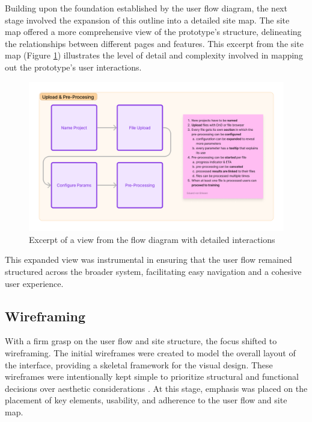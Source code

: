 Building upon the foundation established by the user flow diagram, the next stage involved the expansion of this outline into a detailed site map.
The site map offered a more comprehensive view of the prototype's structure, delineating the relationships between different pages and features.
This excerpt from the site map (Figure \ref{fig:design:flow-2}) illustrates the level of detail and complexity involved in mapping out the prototype's user interactions.

\begin{figure}[htb]
  \centering
  \includegraphics[width=.8\textwidth]{figures/flow-2.png}
  \caption{Excerpt of a view from the flow diagram with detailed interactions}
  \label{fig:design:flow-2}
\end{figure}

This expanded view was instrumental in ensuring that the user flow remained structured across the broader system, facilitating easy navigation and a cohesive user experience.

\subsection*{Wireframing}

With a firm grasp on the user flow and site structure, the focus shifted to wireframing. The initial wireframes were created to model the overall layout of the interface, providing a skeletal framework for the visual design. These wireframes were intentionally kept simple to prioritize structural and functional decisions over aesthetic considerations .
At this stage, emphasis was placed on the placement of key elements, usability, and adherence to the user flow and site map.

